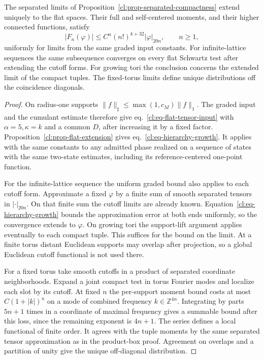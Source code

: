 \documentclass[11pt,letterpaper,reqno]{amsart}
\makeatletter
\numberwithin{equation}{section}
\renewcommand{\eqref}[1]{\textup{eq.~\ref{#1}}}
\theoremstyle{definition}
\newcommand{\ms@majorstart}{%
  \pushQED{\qed}\renewcommand{\qedsymbol}{$\blacksquare\square$}}
\newenvironment{corollary}[1][]{\ms@majorstart\ms@corollary[#1]}
  {\popQED\endms@corollary}
\theoremstyle{remark}
\makeatother
\begin{document}
\begin{corollary}[Growth and convergence of the extended hierarchy]
\label{cl:cor-flat-growth}
The separated limits of Proposition~\ref{cl:prop-separated-compactness}
extend uniquely to the flat spaces. Their full and self-centered
moments, and their higher connected functions, satisfy
\begin{equation}\label{cl:eq-hierarchy-growth}
 |F_n(\varphi)|\le C^n(n!)^{k+32}|\varphi|_{20n},
 \qquad n\ge1 ,
\end{equation}
uniformly for limits from the same graded input constants.
For infinite-lattice sequences the same subsequence converges
on every flat Schwartz test after extending the cutoff forms.
For growing tori the conclusion concerns the extended limit
of the compact tuples. The fixed-torus limits define unique
distributions off the coincidence diagonals.
\end{corollary}

\begin{proof}
On radius-one supports \(\|f\|_\sharp\le\max(1,c_M)\|f\|_1\).
The graded input and the cumulant estimate therefore give
\eqref{cl:eq-flat-tensor-input} with \(\alpha=5,\kappa=k\)
and a common \(D\), after increasing it by a fixed factor.
Proposition~\ref{cl:prop-flat-extension} gives
\eqref{cl:eq-hierarchy-growth}. It applies with the same
constants to any admitted phase realized on a sequence of
states with the same two-state estimates, including its
reference-centered one-point function.

For the infinite-lattice sequence the uniform graded bound
also applies to each cutoff form. Approximate a fixed
\(\varphi\) by a finite sum of smooth separated tensors in
\(|\cdot|_{20n}\). On that finite sum the cutoff limits are
already known. Equation~\ref{cl:eq-hierarchy-growth} bounds
the approximation error at both ends uniformly, so the
convergence extends to \(\varphi\). On growing tori the
support-lift argument applies eventually to each compact
tuple. This suffices for the bound on the limit. At a finite
torus distant Euclidean supports may overlap after projection,
so a global Euclidean cutoff functional is not used there.

For a fixed torus take smooth cutoffs in a product of separated
coordinate neighborhoods. Expand a joint compact test in
torus Fourier modes and localize each slot by its cutoff.
At fixed \(n\) the per-support moment bound costs at most
\(C(1+|k|)^n\) on a mode of combined frequency
\(k\in\mathbb Z^{4n}\). Integrating by parts \(5n+1\) times
in a coordinate of maximal frequency gives a summable
bound after this loss, since the remaining exponent is
\(4n+1\). The series defines a local functional of finite
order. It agrees with the tuple moments by the same separated
tensor approximation as in the product-box proof. Agreement
on overlaps and a partition of unity give the unique
off-diagonal distribution.
\end{proof}
\end{document}
